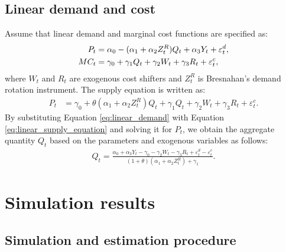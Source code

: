 \documentclass[11pt, a4paper]{article}
\begin{document}
\subsection{Linear demand and cost}
Assume that linear demand and marginal cost functions are specified as:
\begin{align}
    P_{t} &= \alpha_0 - (\alpha_1 + \alpha_2Z^{R}_{t})Q_{t} + \alpha_3 Y_{t} + \varepsilon^{d}_{t},\label{eq:linear_demand}\\
    MC_{t} &= \gamma_0  + \gamma_1 Q_{t} + \gamma_2 W_{t} + \gamma_3 R_{t} + \varepsilon^{c}_{t},\label{eq:linear_{t}arginal_cost}
\end{align}
where $W_{t}$ and $R_{t}$ are exogenous cost shifters and $Z^{R}_{t}$ is Bresnahan's demand rotation instrument. 
The supply equation is written as:
\begin{align}
    P_{t} 
    &= \gamma_0 + \theta (\alpha_1 + \alpha_2 Z^{R}_{t})Q_{t} + \gamma_1 Q_{t} + \gamma_2 W_{t} + \gamma_3 R_{t} +\varepsilon^c_{t}.\label{eq:linear_supply_equation}\end{align}
By substituting Equation \eqref{eq:linear_demand} with Equation \eqref{eq:linear_supply_equation} and solving it for $P_{t}$, we obtain the aggregate quantity $Q_{t}$ based on the parameters and exogenous variables as follows:
\begin{align}
    Q_{t} =  \frac{\alpha_0 + \alpha_3 Y_{t} - \gamma_0 - \gamma_2 W_{t} - \gamma_3 R_{t} + \varepsilon^{d}_{t} - \varepsilon^{c}_{t}}{(1 + \theta) (\alpha_1 + \alpha_2 Z^{R}_{t}) + \gamma_1}.\label{eq:quantity_linear}
\end{align}


\section{Simulation results}\label{sec:results}

\subsection{Simulation and estimation procedure}
\end{document}
